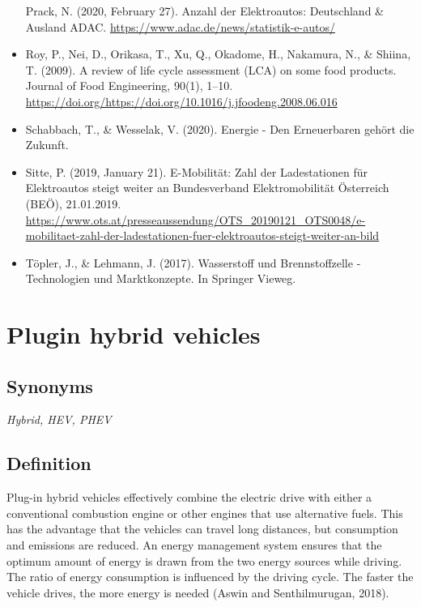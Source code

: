 \documentclass[
]{book}
\begin{document}
\begin{itemize}
  Prack, N. (2020, February 27). Anzahl der Elektroautos: Deutschland \& Ausland \textbar{} ADAC. \url{https://www.adac.de/news/statistik-e-autos/}
\item
  Roy, P., Nei, D., Orikasa, T., Xu, Q., Okadome, H., Nakamura, N., \& Shiina, T. (2009). A review of life cycle assessment (LCA) on some food products. Journal of Food Engineering, 90(1), 1--10. \url{https://doi.org/https://doi.org/10.1016/j.jfoodeng.2008.06.016}
\item
  Schabbach, T., \& Wesselak, V. (2020). Energie - Den Erneuerbaren gehört die Zukunft.
\item
  Sitte, P. (2019, January 21). E-Mobilität: Zahl der Ladestationen für Elektroautos steigt weiter an \textbar{} Bundesverband Elektromobilität Österreich (BEÖ), 21.01.2019. \url{https://www.ots.at/presseaussendung/OTS_20190121_OTS0048/e-mobilitaet-zahl-der-ladestationen-fuer-elektroautos-steigt-weiter-an-bild}
\item
  Töpler, J., \& Lehmann, J. (2017). Wasserstoff und Brennstoffzelle - Technologien und Marktkonzepte. In Springer Vieweg.
\end{itemize}

\hypertarget{plugin_hybrid}{%
\section{Plugin hybrid vehicles}\label{plugin_hybrid}}

\hypertarget{synonyms-45}{%
\subsection*{Synonyms}\label{synonyms-45}}

\emph{Hybrid, HEV, PHEV}

\hypertarget{definition-48}{%
\subsection*{Definition}\label{definition-48}}

Plug-in hybrid vehicles effectively combine the electric drive with either a conventional combustion engine or other engines that use alternative fuels. This has the advantage that the vehicles can travel long distances, but consumption and emissions are reduced. An energy management system ensures that the optimum amount of energy is drawn from the two energy sources while driving. The ratio of energy consumption is influenced by the driving cycle. The faster the vehicle drives, the more energy is needed (Aswin and Senthilmurugan, 2018).
\end{document}
